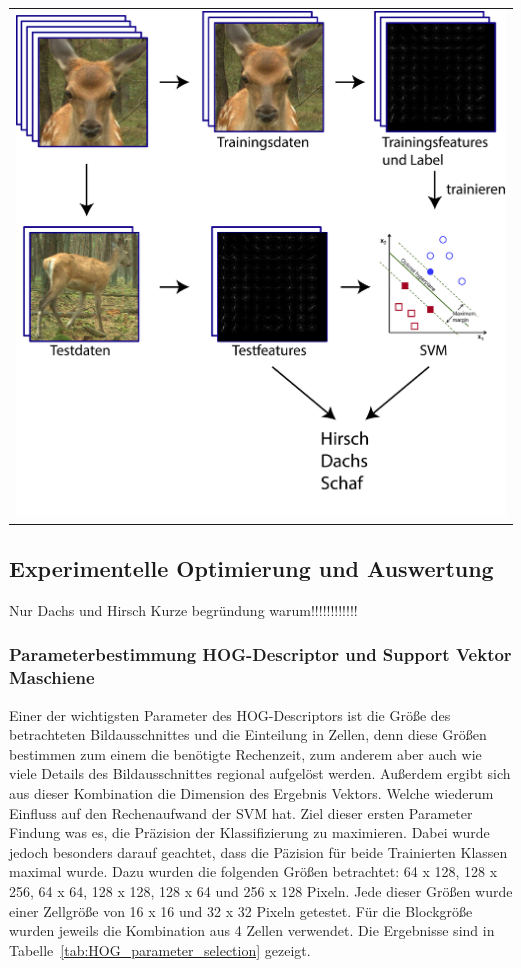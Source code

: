 \begin{center}
\begin{tabular}{c}
\includegraphics[trim={0 0cm 0cm 0cm},clip=true,width=13cm]{img/ClassificationOverview.png}
\end{tabular}
\label{fig:hog_classification_ov}
\end{center}


\subsection{Experimentelle Optimierung und Auswertung} \label{sec:HOG_parameter_and_results}
Nur Dachs und Hirsch
Kurze begründung warum!!!!!!!!!!!! 
\subsubsection{Parameterbestimmung HOG-Descriptor und Support Vektor Maschiene}
Einer der wichtigsten Parameter des HOG-Descriptors ist die Größe des betrachteten Bildausschnittes und die Einteilung in Zellen, denn diese Größen bestimmen zum einem die benötigte Rechenzeit, zum anderem aber auch wie viele Details des Bildausschnittes regional aufgelöst werden. Außerdem ergibt sich aus dieser Kombination die Dimension des Ergebnis Vektors. Welche wiederum Einfluss auf den Rechenaufwand der SVM hat. Ziel dieser ersten Parameter Findung was es, die Präzision der Klassifizierung zu maximieren. Dabei wurde jedoch besonders darauf geachtet, dass die Päzision für beide Trainierten Klassen maximal wurde. Dazu wurden die folgenden Größen betrachtet: 64 x 128, 128  x 256, 64 x 64, 128 x 128, 128 x 64 und 256 x 128 Pixeln. Jede dieser Größen wurde einer Zellgröße von 16 x 16 und 32 x 32 Pixeln getestet. Für die Blockgröße wurden jeweils die Kombination aus 4 Zellen verwendet. Die Ergebnisse sind in Tabelle~\ref{tab:HOG_parameter_selection} gezeigt.  

